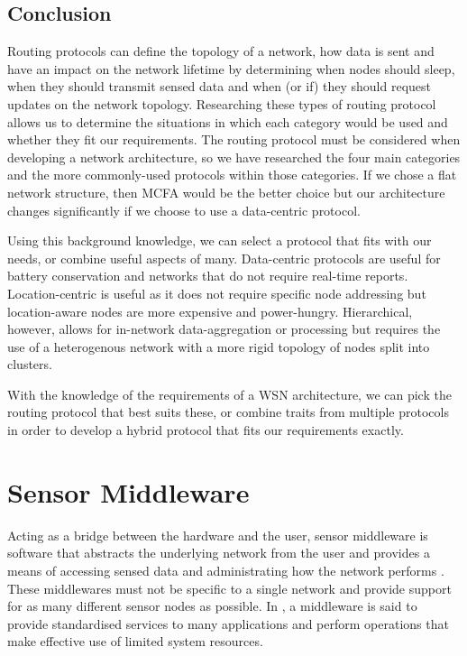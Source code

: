 \subsection{Conclusion}
Routing protocols can define the topology of a network, how data is sent and have an impact on the network lifetime by determining when nodes should sleep, when they should transmit sensed data and when (or if) they should request updates on the network topology. Researching these types of routing protocol allows us to determine the situations in which each category would be used and whether they fit our requirements. The routing protocol must be considered when developing a network architecture, so we have researched the four main categories and the more commonly-used protocols within those categories. If we chose a flat network structure, then MCFA would be the better choice but our architecture changes significantly if we choose to use a data-centric protocol. 

Using this background knowledge, we can select a protocol that fits with our needs, or combine useful aspects of many. Data-centric protocols are useful for battery conservation and networks that do not require real-time reports. Location-centric is useful as it does not require specific node addressing but location-aware nodes are more expensive and power-hungry. Hierarchical, however, allows for in-network data-aggregation or processing but requires the use of a heterogenous network with a more rigid topology of nodes split into clusters.

With the knowledge of the requirements of a WSN architecture, we can pick the routing protocol that best suits these, or combine traits from multiple protocols in order to develop a hybrid protocol that fits our requirements exactly.
\section{Sensor Middleware} \label{bg:sm}
	Acting as a bridge between the hardware and the user, sensor middleware is software that abstracts the underlying network from the user and provides a means of accessing sensed data and administrating how the network performs \cite{Hadim2006}. These middlewares must not be specific to a single network and provide support for as many different sensor nodes as possible. In \cite{Yu2004}, a middleware is said to provide standardised services to many applications and perform operations that make effective use of limited system resources.


